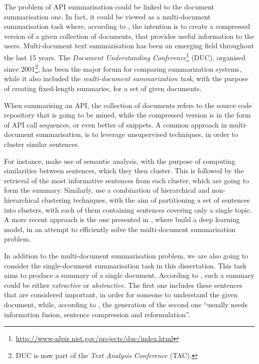 The problem of API summarisation could be linked to the document summarisation one. In fact, it could be viewed as a multi-document summarisation task where, according to  \cite{Aliguliyev:2010}, the intention is to create a compressed version of a given collection of documents, that provides useful information to the users. Multi-document text summarisation has been an emerging field throughout the last 15 years. The \textit{Document Understanding Conference}\footnote{\url{http://www-nlpir.nist.gov/projects/duc/index.html}} (DUC), organised since 2001\footnote{DUC is now part of the \textit{Text Analysis Conference} (TAC).}, has been the major forum for comparing summarization systems, while it also included the \textit{multi-document summarization task}, with the purpose of creating fixed-length summaries, for a set of given documents.

When summarising an API, the collection of documents refers to the source code repository that is going to be mined, while the compressed version is in the form of API call sequences, or even better of snippets. A common approach in multi-document summarisation, is to leverage unsupervised techniques, in order to cluster similar sentences. 

For instance,  make use of semantic analysis, with the purpose of computing similarities between sentences, which they then cluster. This is followed by the retrieval of the most informative sentences from each cluster, which are going to form the summary. Similarly,  \cite{Boros:2001} use a combination of hierarchical and non-hierarchical clustering techniques, with the aim of partitioning a set of sentences into clusters, with each of them containing sentences covering only a single topic. A more recent approach is the one presented in \cite{Liu:2012}, where  build a deep learning model, in an attempt to efficiently solve the multi-document summarisation problem.

In addition to the multi-document summarisation problem, we are also going to consider the single-document summarisation task in this dissertation. This task aims to produce a summary of a single document. According to  \cite{Aliguliyev:2010}, such a summary could be either \textit{extractive} or \textit{abstractive}. The first one includes these sentences that are considered important, in order for someone to understand the given document, while, according to , the generation of the second one ``usually needs information fusion, sentence compression and reformulation''.


